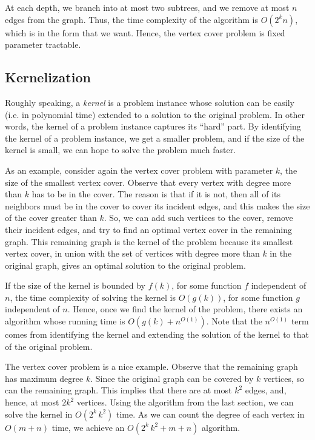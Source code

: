 \documentclass{article}
\begin{document}
At each depth, we branch into at most two subtrees, and we remove at most
$n$ edges from the graph. Thus, the time complexity of the algorithm is $O(2^kn)$,
which is in the form that we want. Hence, the vertex cover problem is fixed parameter
tractable.

\subsection{Kernelization}
Roughly speaking, a \emph{kernel} is a problem instance whose solution
can be easily (i.e. in polynomial time) extended to a solution to the original problem. 
In other words, the kernel of a problem instance captures its ``hard'' part. By identifying the kernel of
a problem instance, we get a smaller problem, and if the size of the kernel is small,
we can hope to solve the problem much faster.

As an example, consider again the vertex cover problem with parameter $k$, the
size of the smallest vertex cover. Observe that every vertex with degree more than
$k$ has to be in the cover. The reason is that if it is not, then all of its 
neighbors must be in the cover to cover its incident edges, and this makes the
size of the cover greater than $k$. So, we can add such vertices to the 
cover, remove their incident edges, and try to find an optimal vertex cover in
the remaining graph. This remaining graph is the kernel of the problem because
its smallest vertex cover, in union with the set of vertices with degree more than $k$ 
in the original graph, gives an optimal solution to the original problem.

If the size of the kernel is bounded by $f(k)$, for some function $f$ independent of $n$, 
the time complexity of solving the kernel is $O(g(k))$, for some function $g$ independent of $n$. 
Hence, once we find the kernel of the problem, there exists an algorithm whose running time is 
$O(g(k) + n^{O(1)})$. Note that the $n^{O(1)}$ term comes from identifying the kernel and extending
the solution of the kernel to that of the original problem.

The vertex cover problem is a nice example. Observe that the remaining graph has maximum degree $k$.
Since the original graph can be covered by $k$ vertices, so can the remaining graph. This implies
that there are at most $k^2$ edges, and, hence, at most $2k^2$ vertices. Using the algorithm
from the last section, we can solve the kernel in $O(2^k\, k^2)$ time. As we can count the degree
of each vertex in $O(m+n)$ time, we achieve an $O(2^k\, k^2 + m+n)$ algorithm.
\end{document}

